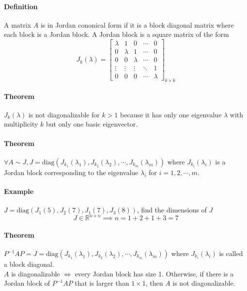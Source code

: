 \paragraph*{Definition}
A matrix $A$ is in Jordan cononical form if it is a block diagonal matrix where each block is a Jordan block. A Jordan block is a square matrix of the form
\begin{equation*}
    J_k(\lambda) = \begin{bmatrix}
        \lambda & 1 & 0 & \cdots & 0 \\
        0 & \lambda & 1 & \cdots & 0 \\
        0 & 0 & \lambda & \cdots & 0 \\
        \vdots & \vdots & \vdots & \ddots & 1 \\
        0 & 0 & 0 & \cdots & \lambda
    \end{bmatrix}_{k \times k}
\end{equation*}

\paragraph*{Theorem}
$J_k(\lambda)$ is not diagonalizable for $k > 1$ because it has only one eigenvalue $\lambda$ with multiplicity $k$ but only one basic eigenvector.

\paragraph*{Theorem}
$\forall A \sim J, J = \text{diag}(J_{k_1}(\lambda_1), J_{k_2}(\lambda_2), \cdots, J_{k_m}(\lambda_m))$ where $J_{k_i}(\lambda_i)$ is a Jordan block corresponding to the eigenvalue $\lambda_i$ for $i = 1, 2, \cdots, m$.

\paragraph*{Example}
$J = \text{diag}(J_1(5), J_2(7), J_1(7), J_3(8))$, find the dimensions of $J$
\begin{equation*}
    J \in \mathbb{R}^{n \times n} \implies n = 1 + 2 + 1 + 3 = 7
\end{equation*}

\paragraph*{Theorem}
$P^{-1}AP = J = \text{diag}(J_{k_1}(\lambda_1), J_{k_2}(\lambda_2), \cdots, J_{k_m}(\lambda_m))$ where $J_{k_i}(\lambda_i)$ is called a block diagonal.\\
$A$ is diagonalizable $\iff$ every Jordan block has size 1. Otherwise, if there is a Jordan block of $P^{-1}AP$ that is larger than $1 \times 1$, then $A$ is not diagonalizable.

